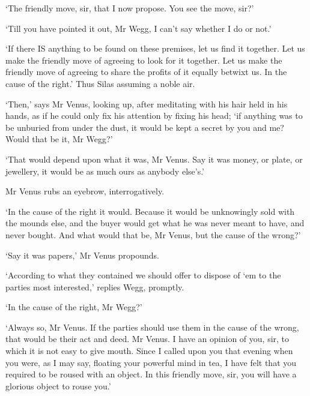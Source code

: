 ‘The friendly move, sir, that I now propose. You see the move, sir?’

‘Till you have pointed it out, Mr Wegg, I can’t say whether I do or
not.’

‘If there IS anything to be found on these premises, let us find it
together. Let us make the friendly move of agreeing to look for it
together. Let us make the friendly move of agreeing to share the
profits of it equally betwixt us. In the cause of the right.’ Thus Silas
assuming a noble air.

‘Then,’ says Mr Venus, looking up, after meditating with his hair held
in his hands, as if he could only fix his attention by fixing his head;
‘if anything was to be unburied from under the dust, it would be kept a
secret by you and me? Would that be it, Mr Wegg?’

‘That would depend upon what it was, Mr Venus. Say it was money, or
plate, or jewellery, it would be as much ours as anybody else’s.’

Mr Venus rubs an eyebrow, interrogatively.

‘In the cause of the right it would. Because it would be unknowingly
sold with the mounds else, and the buyer would get what he was never
meant to have, and never bought. And what would that be, Mr Venus, but
the cause of the wrong?’

‘Say it was papers,’ Mr Venus propounds.

‘According to what they contained we should offer to dispose of ‘em to
the parties most interested,’ replies Wegg, promptly.

‘In the cause of the right, Mr Wegg?’

‘Always so, Mr Venus. If the parties should use them in the cause of the
wrong, that would be their act and deed. Mr Venus. I have an opinion of
you, sir, to which it is not easy to give mouth. Since I called upon you
that evening when you were, as I may say, floating your powerful mind in
tea, I have felt that you required to be roused with an object. In this
friendly move, sir, you will have a glorious object to rouse you.’

